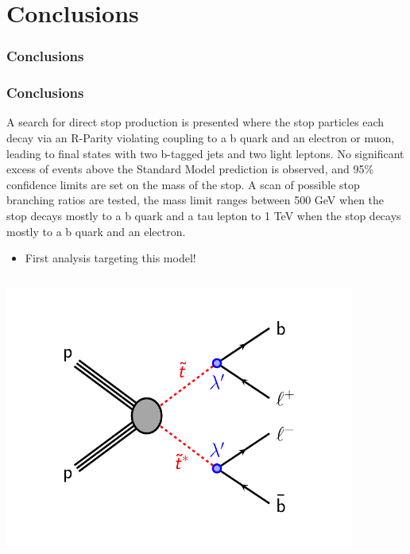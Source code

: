 \documentclass[10pt, svgnames]{beamer}
\begin{document}
\section{Conclusions}

\begin{frame}
  \frametitle{Conclusions}
  \UpdateFlag
  \frametitle{Conclusions}
  {
    \small
  A search for direct stop production is presented where the stop particles each
  decay via an R-Parity violating coupling to a b quark and an electron or
  muon, leading to final states with two b-tagged jets and two light leptons.
  No significant excess of events above the Standard Model prediction is
  observed, and 95\% confidence limits are set on the mass of the stop.
  A scan of possible stop branching ratios are tested, the mass limit ranges
  between 500 GeV when the stop decays mostly to a b quark and a tau lepton to
  1 TeV when the stop decays mostly to a b quark and an electron.
}
\vspace{1ex}
  \begin{itemize}
    \item First analysis targeting this model!
  \end{itemize}
  \begin{columns}
    \begin{center}
      \includegraphics[width=0.9\textwidth]
      {figures/b_minus_l_stop_stop.pdf}
    \end{center}
    \begin{center}

\end{center}
\end{columns}
\end{frame}
\end{document}
